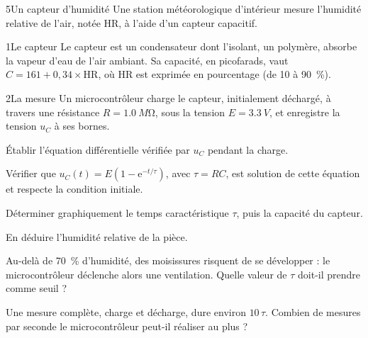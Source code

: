 \begin{exoBac}{5}{Un capteur d'humidité}
Une station météorologique d'intérieur mesure l'humidité relative de l'air, notée HR, à l'aide d'un capteur capacitif.
\begin{docu}{1}{Le capteur}
Le capteur est un condensateur dont l'isolant, un polymère, absorbe la vapeur d'eau de l'air ambiant. Sa capacité, en
picofarads, vaut $C=161+0{,}34\times\mathrm{HR}$, où HR est exprimée en pourcentage (de 10 à 90~\%).
\end{docu}
\begin{docu}{2}{La mesure}
Un microcontrôleur charge le capteur, initialement déchargé, à travers une résistance $R=\qty{1,0}{M\ohm}$, sous la tension
$E=\qty{3,3}{V}$, et enregistre la tension $u_C$ à ses bornes.
\end{docu}
\begin{questions}
\item Établir l'équation différentielle vérifiée par $u_C$ pendant la charge.
\item Vérifier que $u_C(t)=E\left(1-\mathrm{e}^{-t/\tau}\right)$, avec $\tau=RC$, est solution de cette équation et respecte la condition
initiale.
\item Déterminer graphiquement le temps caractéristique $\tau$, puis la capacité du capteur.
\item En déduire l'humidité relative de la pièce.
\item \initiative Au-delà de 70~\% d'humidité, des moisissures risquent de se développer : le microcontrôleur déclenche
alors une ventilation. Quelle valeur de $\tau$ doit-il prendre comme seuil ?
\item Une mesure complète, charge et décharge, dure environ $10\,\tau$. Combien de mesures par seconde le microcontrôleur
peut-il réaliser au plus ?
\end{questions}
\end{exoBac}
